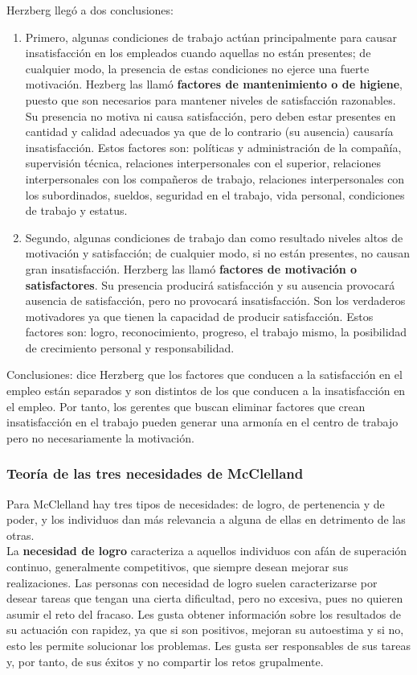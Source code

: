 \documentclass[12pt]{article}
\theoremstyle{definition_wo_parentheses}
\begin{document}
Herzberg llegó a dos conclusiones:
\begin{enumerate}
\item Primero, algunas condiciones de trabajo actúan principalmente para causar insatisfacción en los empleados cuando aquellas no están presentes; de cualquier modo, la presencia de estas condiciones no ejerce una fuerte motivación. Hezberg las llamó \textbf{factores de mantenimiento o de higiene}, puesto que son necesarios para mantener niveles de satisfacción razonables. Su presencia no motiva ni causa satisfacción, pero deben estar presentes en cantidad y calidad adecuados ya que de lo contrario (su ausencia) causaría insatisfacción. Estos factores son: políticas y administración de la compañía, supervisión técnica, relaciones interpersonales con el superior, relaciones interpersonales con los compañeros de trabajo, relaciones interpersonales con los subordinados, sueldos, seguridad en el trabajo, vida personal, condiciones de trabajo y estatus.
\item Segundo, algunas condiciones de trabajo dan como resultado niveles altos de motivación y satisfacción; de cualquier modo, si no están presentes, no causan gran insatisfacción. Herzberg las llamó \textbf{factores de motivación o satisfactores}. Su presencia producirá satisfacción y su ausencia provocará ausencia de satisfacción, pero no provocará insatisfacción. Son los verdaderos motivadores ya que tienen la capacidad de producir satisfacción. Estos factores son: logro, reconocimiento, progreso, el trabajo mismo, la posibilidad de crecimiento personal y responsabilidad.
\end{enumerate}

Conclusiones: dice Herzberg que los factores que conducen a la satisfacción en el empleo están separados y son distintos de los que conducen a la insatisfacción en el empleo. Por tanto, los gerentes que buscan eliminar factores que crean insatisfacción en el trabajo pueden generar una armonía en el centro de trabajo pero no necesariamente la motivación.

\subsubsection{Teoría de las tres necesidades de McClelland}
Para McClelland hay tres tipos de necesidades: de logro, de pertenencia y de poder, y los individuos dan más relevancia a alguna de ellas en detrimento de las otras.\\

La \textbf{necesidad de logro} caracteriza a aquellos individuos con afán de superación continuo, generalmente competitivos, que siempre desean mejorar sus realizaciones. Las personas con necesidad de logro suelen caracterizarse por desear tareas que tengan una cierta dificultad, pero no excesiva, pues no quieren asumir el reto del fracaso. Les gusta obtener información sobre los resultados de su actuación con rapidez, ya que si son positivos, mejoran su autoestima y si no, esto les permite solucionar los problemas. Les gusta ser responsables de sus tareas y, por tanto, de sus éxitos y no compartir los retos grupalmente.\\
\end{document}
